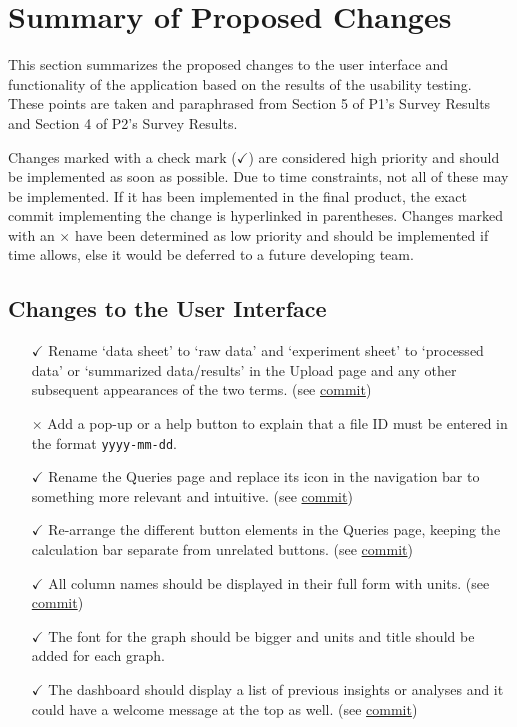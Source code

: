 \documentclass{article}
\begin{document}
\section{Summary of Proposed Changes}
This section summarizes the proposed changes to the user interface and
functionality of the application based on the results of the usability testing.
These points are taken and paraphrased from Section 5 of P1's Survey Results and
Section 4 of P2's Survey Results. 

Changes marked with a check mark ($\checkmark$) are considered high priority and
should be implemented as soon as possible. Due to time constraints, not all of
these may be implemented. If it has been implemented in the final product, the
exact commit implementing the change is hyperlinked in parentheses. Changes
marked with an $\times$ have been determined as low priority and should be
implemented if time allows, else it would be deferred to a future developing
team.

\subsection{Changes to the User Interface}

\begin{itemize}
    \item[$\checkmark$] Rename `data sheet' to `raw data' and `experiment sheet'
    to `processed data' or `summarized data/results' in the Upload page and any other
    subsequent appearances of the two terms. (see
    \href{https://github.com/SumanyaG/Alkalytics/commit/53ba5521bb378b55e89e74bd13ca00e57eb8eb28}{commit})
    \item[$\times$] Add a pop-up or a help button to explain that a file ID must be
    entered in the format \texttt{yyyy-mm-dd}.
    \item[$\checkmark$] Rename the Queries page and replace its icon in the
    navigation bar to something more relevant and intuitive. (see
    \href{https://github.com/SumanyaG/Alkalytics/commit/d3c98b683118b141b05c5a09b3c770c3c03a897c}{commit})
    \item[$\checkmark$] Re-arrange the different button elements in the Queries
    page, keeping the calculation bar separate from unrelated buttons. (see
    \href{https://github.com/SumanyaG/Alkalytics/commit/8a745c4c77a444c449af95b4ebfeed01ffa6b4b6}{commit})
    \item[$\checkmark$] All column names should be displayed in their full form
    with units. (see
    \href{https://github.com/SumanyaG/Alkalytics/commit/db5000a1cb3ff4bc0b9faedc4bab3176df5a1147}{commit})
    \item[$\checkmark$] The font for the graph should be bigger and units and
    title should be added for each graph.
    \item[$\checkmark$] The dashboard should display a list of previous insights
    or analyses and it could have a welcome message at the top as well. (see
    \href{https://github.com/SumanyaG/Alkalytics/commit/0a362f9e9cbe2f7c2189a084310a3527440535b9}{commit})
\end{itemize}
\end{document}
